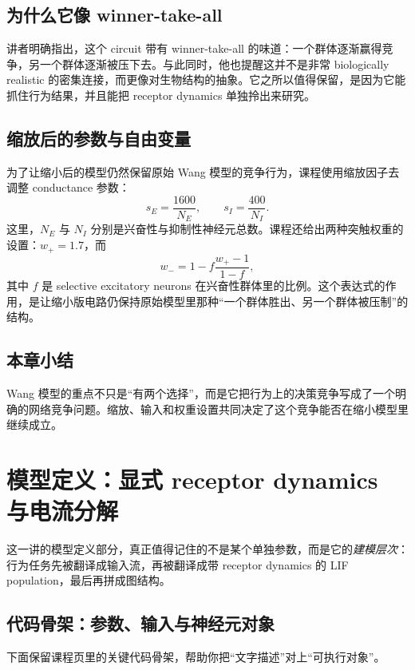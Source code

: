 \documentclass[a4paper]{article}
\begin{document}
\subsection{为什么它像 winner-take-all}
讲者明确指出，这个 circuit 带有 winner-take-all 的味道：一个群体逐渐赢得竞争，另一个群体逐渐被压下去。与此同时，他也提醒这并不是非常 biologically realistic 的密集连接，而更像对生物结构的抽象。它之所以值得保留，是因为它能抓住行为结果，并且能把 receptor dynamics 单独拎出来研究。

\subsection{缩放后的参数与自由变量}
为了让缩小后的模型仍然保留原始 Wang 模型的竞争行为，课程使用缩放因子去调整 conductance 参数：
\begin{equation}
s_E = \frac{1600}{N_E}, \qquad s_I = \frac{400}{N_I}.
\end{equation}
这里，$N_E$ 与 $N_I$ 分别是兴奋性与抑制性神经元总数。课程还给出两种突触权重的设置：$w_+=1.7$，而
\begin{equation}
w_- = 1 - f\frac{w_+ - 1}{1 - f},
\end{equation}
其中 $f$ 是 selective excitatory neurons 在兴奋性群体里的比例。这个表达式的作用，是让缩小版电路仍保持原始模型里那种“一个群体胜出、另一个群体被压制”的结构。

\subsection{本章小结}
Wang 模型的重点不只是“有两个选择”，而是它把行为上的决策竞争写成了一个明确的网络竞争问题。缩放、输入和权重设置共同决定了这个竞争能否在缩小模型里继续成立。

\section{模型定义：显式 receptor dynamics 与电流分解}
这一讲的模型定义部分，真正值得记住的不是某个单独参数，而是它的\emph{建模层次}：行为任务先被翻译成输入流，再被翻译成带 receptor dynamics 的 LIF population，最后再拼成图结构。

\subsection{代码骨架：参数、输入与神经元对象}
下面保留课程页里的关键代码骨架，帮助你把“文字描述”对上“可执行对象”。
\end{document}
